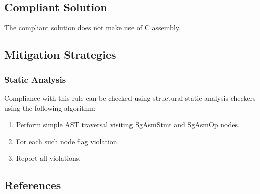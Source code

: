 {{}\hlsym{\hlstd{\ \ \ \ \ \ \ \ \ \ \ \ \ \ \ \ \ \ \ \ \ \ \ \ }}\hlstd{:\ }\hlstd{}\hlsym{)}\hlstd{;\\
}\hlstd{\hlstd{\ \ }}\hlstd{}\hlsym{\}\\
}\hlsym{}\hlstd{}\hlstd{}\\
\mbox{}\\
\normalfont
















}


\subsection{Compliant Solution}
The compliant solution does not make use of C assembly.

\subsection{Mitigation Strategies}
\subsubsection{Static Analysis} 

Compliance with this rule can be checked using structural static analysis checkers using the following algorithm:

\begin{enumerate}
\item Perform simple AST traversal visiting SgAsmStmt and SgAsmOp nodes.
\item For each such node flag violation.
\item Report all violations. 
\end{enumerate}

\subsection{References}

